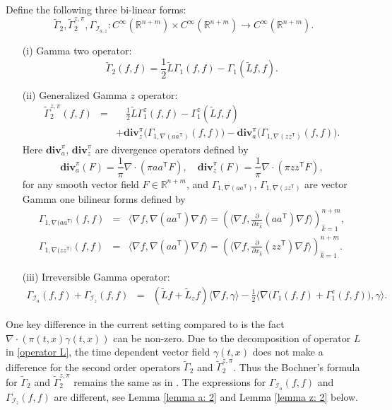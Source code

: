 \documentclass[11pt,reqno]{amsart}
\newcommand{\la}{\langle}
\newcommand{\ra}{\rangle}
\newcommand{\ts}{\mathsf{T}}
\newcommand{\beaa}{\begin{eqnarray*}}
\newcommand{\eeaa}{\end{eqnarray*}}
\def\div{\mathbf{div}}
\begin{document}
\begin{definition}\label{defn:tilde gamma 2 znew}
Define the following three bi-linear forms: 
\begin{equation*}
 \widetilde\Gamma_{2}, \widetilde\Gamma_{2}^{z,\pi}, \Gamma_{\mathcal{I}_{a,z}}\colon C^{\infty}(\mathbb{R}^{n+m})\times C^{\infty}(\mathbb{R}^{n+m})\rightarrow C^{\infty}(\mathbb{R}^{n+m}).
\end{equation*}
\begin{itemize}
\item[(i)] Gamma two operator: 
\begin{equation*}
\widetilde\Gamma_{2}(f,f)=\frac{1}{2}\widetilde L\Gamma_{1}(f,f)-\Gamma_{1}(\widetilde Lf, f).
\end{equation*}
\item[(ii)] Generalized Gamma $z$ operator:
\beaa
\widetilde\Gamma_2^{z,\pi}(f,f)&=&\quad\frac{1}{2}\widetilde L\Gamma_1^{z}(f,f)-\Gamma_{1}^z(\widetilde Lf,f)\\
&& \label{new term}+\div^{{\pi}}_z\Big(\Gamma_{1,\nabla(aa^{\ts})}(f,f )\Big)-\div^{{\pi} }_a\Big(\Gamma_{1,\nabla(zz^{\ts})}(f,f )\Big).
  \eeaa 
Here $\div^{{\pi} }_a$, $\div^{{\pi} }_z$ are divergence operators defined by
\begin{equation*}
\div^{{\pi}}_a(F)=\frac{1}{{\pi} }\nabla\cdot({\pi} aa^{\ts} F), \quad\div^{{\pi} }_z(F)=\frac{1}{{\pi} }\nabla\cdot({\pi} zz^{\ts}F),
\end{equation*}
for any smooth vector field $F\in \mathbb{R}^{n+m}$, and $\Gamma_{1, \nabla (aa^{\ts})}$, $\Gamma_{1, \nabla (zz^{\ts})}$ are vector Gamma one bilinear forms defined by 
\beaa
\Gamma_{1,\nabla(aa^{\ts)}}(f,f)&=&\la \nabla f,\nabla(aa^{\ts})\nabla f\ra=(\la \nabla f,\frac{\partial}{\partial x_{\hat k}}(aa^{\ts})\nabla f\ra)_{\hat k=1}^{n+m},\\
\Gamma_{1,\nabla(zz^{\ts)}}(f,f)&=&\la \nabla f,\nabla(aa^{\ts})\nabla f\ra=(\la \nabla f,\frac{\partial}{\partial x_{\hat k}}(zz^{\ts})\nabla f\ra)_{\hat k=1}^{n+m}.
\eeaa
\item[(iii)] Irreversible Gamma operator: 
\beaa
\Gamma_{\mathcal{I}_{a}}(f,f)+\Gamma_{\mathcal{I}_{z}}(f,f)&=& (\widetilde Lf+\widetilde L_zf) \la \nabla f,\gamma\ra -\frac{1}{2}\la \nabla \big(\Gamma_1(f,f)+\Gamma_1^z(f,f)\big),\gamma\ra .
\eeaa
\end{itemize}
\end{definition}
	\begin{remark}
 One key difference in the current setting compared to \cite{FengLi2021} is the fact $\nabla\cdot (\pi(t,x)\gamma(t,x))$ can be non-zero. Due to the decomposition of operator $L$ in \eqref{operator L}, the time dependent vector field $\gamma(t,x)$ does not make a difference for the second order operators $\widetilde\Gamma_2$ and $\widetilde\Gamma_2^{z,\pi}$. Thus the Bochner's formula for $\widetilde\Gamma_2$ and $\widetilde\Gamma_2^{z,\pi}$ remains the same as in \cite{FengLi2021}. The expressions for $\Gamma_{\mathcal{I}_{a}}(f,f)$ and $\Gamma_{\mathcal{I}_{z}}(f,f)$ are different, see Lemma \ref{lemma a: 2} and Lemma \ref{lemma z: 2} below. 
	\end{remark}
 
\end{document}
